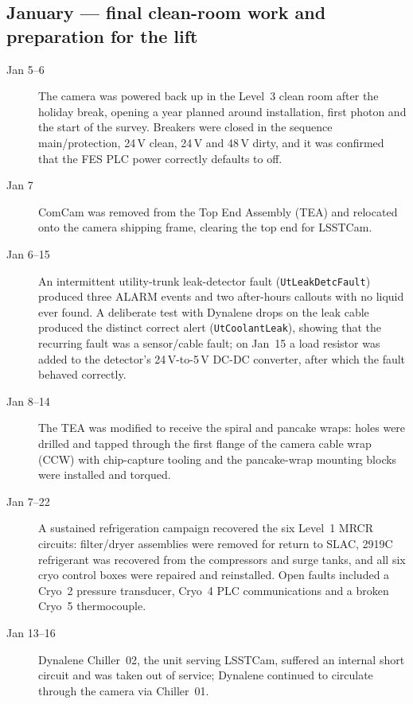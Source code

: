 \subsection{January --- final clean-room work and preparation for the lift}
\begin{description}
\item[Jan 5--6] The camera was powered back up in the Level~3 clean
  room after the holiday break, opening a year planned around
  installation, first photon and the start of the survey.  Breakers
  were closed in the sequence main/protection, 24\,V clean, 24\,V and
  48\,V dirty, and it was confirmed that the FES PLC power correctly
  defaults to off.

\item[Jan 7] ComCam was removed from the Top End Assembly (TEA) and
  relocated onto the camera shipping frame, clearing the top end for
  LSSTCam.

\item[Jan 6--15] An intermittent utility-trunk leak-detector fault
  (\texttt{UtLeakDetcFault}) produced three ALARM events and two
  after-hours callouts with no liquid ever found.  A deliberate test
  with Dynalene drops on the leak cable produced the distinct correct
  alert (\texttt{UtCoolantLeak}), showing that the recurring fault was
  a sensor/cable fault; on Jan~15 a load resistor was added to the
  detector's 24\,V-to-5\,V DC-DC converter, after which the fault
  behaved correctly.

\item[Jan 8--14] The TEA was modified to receive the spiral and
  pancake wraps: holes were drilled and tapped through the first
  flange of the camera cable wrap (CCW) with chip-capture tooling and
  the pancake-wrap mounting blocks were installed and torqued.

\item[Jan 7--22] A sustained refrigeration campaign recovered the six
  Level~1 MRCR circuits: filter/dryer assemblies were removed for
  return to SLAC, 2919C refrigerant was recovered from the compressors
  and surge tanks, and all six cryo control boxes were repaired and
  reinstalled.  Open faults included a Cryo~2 pressure transducer,
  Cryo~4 PLC communications and a broken Cryo~5 thermocouple.

\item[Jan 13--16] Dynalene Chiller~02, the unit serving LSSTCam,
  suffered an internal short circuit and was taken out of service;
  Dynalene continued to circulate through the camera via Chiller~01.


\end{description}
